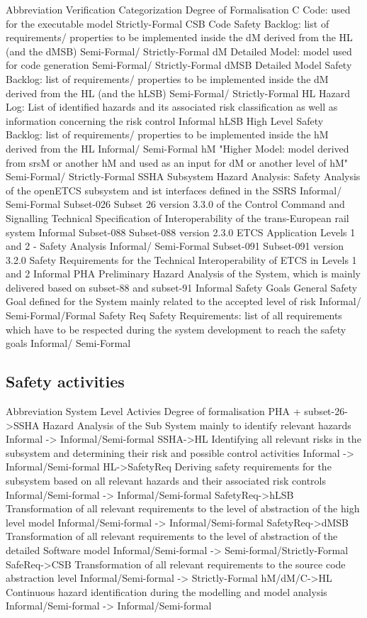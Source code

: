 \documentclass{template/openetcs_article}
\begin{document}
Abbreviation	Verification Categorization	Degree of Formalisation
C	Code: used for the executable model	Strictly-Formal
CSB	Code Safety Backlog: list of requirements/ properties to be implemented inside the dM derived from  the HL (and the dMSB)	Semi-Formal/ Strictly-Formal
dM	Detailed Model: model used for code generation	Semi-Formal/ Strictly-Formal
dMSB	Detailed Model Safety Backlog: list of requirements/ properties to be implemented inside the dM derived from the HL (and  the hLSB)	Semi-Formal/ Strictly-Formal
HL	Hazard Log: List of identified hazards and its associated risk classification as well as information concerning the risk control	Informal
hLSB	High Level Safety Backlog: list of requirements/ properties to be implemented inside the hM derived from the HL	Informal/ Semi-Formal
hM	"Higher Model: model derived from srsM or another hM 
and used as an input for dM or another level of hM"	Semi-Formal/ Strictly-Formal
SSHA	Subsystem Hazard Analysis: Safety Analysis of the openETCS subsystem and ist interfaces defined in the SSRS	Informal/ Semi-Formal
Subset-026	Subset 26 version 3.3.0 of the Control Command and Signalling Technical Specification of Interoperability of the trans-European rail system	Informal
Subset-088	Subset-088 version 2.3.0 ETCS Application Levels 1 and 2 - Safety Analysis	Informal/ Semi-Formal
Subset-091	Subset-091 version 3.2.0 Safety Requirements for the Technical Interoperability of ETCS in Levels 1 and 2	Informal
PHA	Preliminary Hazard Analysis of the System, which is mainly delivered based on subset-88 and subset-91	Informal
Safety Goals	General Safety Goal defined for the System mainly related to the accepted level of risk	Informal/ Semi-Formal/Formal
Safety Req	Safety Requirements: list of all requirements which have to be respected during the system development to reach the safety goals	Informal/ Semi-Formal

\subsection{Safety activities}

Abbreviation	System Level Activies	Degree of formalisation
PHA + subset-26->SSHA	Hazard Analysis of the Sub System mainly to identify relevant hazards	Informal -> Informal/Semi-formal
SSHA->HL	Identifying all relevant risks in the subsystem and determining their risk and possible control activities	Informal -> Informal/Semi-formal
HL->SafetyReq	Deriving safety requirements for the subsystem based on all relevant hazards and their associated risk controls  	Informal/Semi-formal -> Informal/Semi-formal
SafetyReq->hLSB	Transformation of all relevant requirements to the level of abstraction of the high level model	Informal/Semi-formal -> Informal/Semi-formal
SafetyReq->dMSB	Transformation of all relevant requirements to the level of abstraction of the detailed Software model	Informal/Semi-formal -> Semi-formal/Strictly-Formal
SafeReq->CSB	Transformation of all relevant requirements to the source code abstraction level	Informal/Semi-formal -> Strictly-Formal
hM/dM/C->HL	Continuous hazard identification during the modelling and model analysis	Informal/Semi-formal -> Informal/Semi-formal
		
\end{document}
